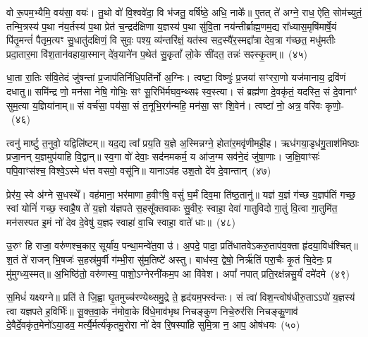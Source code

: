 वो रू॒पम॒भ्यैमि॒ वय॑सा॒ वयः॑। तु॒थो वो॑ वि॒श्ववे॑दा॒ वि भ॑जतु॒ वर्\mbox{}षि॑ष्ठे॒ अधि॒ नाके᳚॥ ए॒तत् ते॑ अग्ने॒ राध॒ ऐति॒ सोम॑च्युतं॒ तन्मि॒त्रस्य॑ प॒था न॑य॒र्तस्य॑ प॒था प्रेत॑ च॒न्द्रद॑क्षिणा य॒ज्ञस्य॑ प॒था सु॑वि॒ता नय॑न्तीर्ब्राह्म॒णम॒द्य रा᳚ध्यास॒मृषि॑मार्\mbox{}षे॒यं पि॑तृ॒मन्तं॑ पैतृम॒त्यꣳ सु॒धातु॑दक्षिणं॒ वि सुवः॒ पश्य॒ व्य॑न्तरि॑क्षं॒ यत॑स्व सद॒स्यै॑र॒स्मद्दा᳚त्रा देव॒त्रा ग॑च्छत॒ मधु॑मतीः प्रदा॒तार॒मा वि॑श॒तान॑वहाया॒स्मान् दे॑व॒याने॑न प॒थेत॑ सु॒कृतां᳚ लो॒के सी॑दत॒ तन्नः॑ सꣴस्कृ॒तम्॥~(४५)

{\anuvakamend[{रू॒पेण॑ सद॒स्यै॑र॒ष्टाद॑श च}]}%

धा॒ता रा॒तिः स॑वि॒तेदं जु॑षन्तां प्र॒जा\-प॑तिर्निधि॒पति॑र्नो अ॒ग्निः। त्वष्टा॒ विष्णुः॑ प्र॒जया॑ सꣳररा॒णो यज॑मानाय॒ द्रवि॑णं दधातु॥ समि॑न्द्र णो॒ मन॑सा नेषि॒ गोभिः॒ सꣳ सू॒रिभि॑र्मघव॒न्थ्सꣴ स्व॒स्त्या। सं ब्रह्म॑णा दे॒वकृ॑तं॒ यदस्ति॒ सं दे॒वानाꣳ॑ सुम॒त्या य॒ज्ञिया॑नाम्॥ सं वर्च॑सा॒ पय॑सा॒ सं त॒नूभि॒रग॑न्महि॒ मन॑सा॒ सꣳ शि॒वेन॑। त्वष्टा॑ नो॒ अत्र॒ वरि॑वः कृणो॒-~(४६)

त्वनु॑ मार्ष्टु त॒नुवो॒ यद्विलि॑ष्टम्॥ यद॒द्य त्वा᳚ प्रय॒ति य॒ज्ञे अ॒स्मिन्नग्ने॒ होता॑र॒मवृ॑णीमही॒ह। ऋध॑गया॒डृध॑गु॒ताश॑मिष्ठाः प्रजा॒नन् य॒ज्ञमुप॑याहि वि॒द्वान्॥ स्व॒गा वो॑ देवाः॒ सद॑नमकर्म॒ य आ॑ज॒ग्म सव॑ने॒दं जु॑षा॒णाः। ज॒क्षि॒वाꣳसः॑ पपि॒वाꣳस॑श्च॒ विश्वे॒\-ऽस्मे ध॑त्त वसवो॒ वसू॑नि॥ याना\-ऽव॑ह उश॒तो दे॑व दे॒वान्तान्~(४७)

प्रेर॑य॒ स्वे अ॑ग्ने स॒धस्थे᳚। वह॑माना॒ भर॑माणा ह॒वीꣳषि॒ वसुं॑ घ॒र्मं दिव॒मा ति॑ष्ठ॒तानु॑॥ यज्ञ॑ य॒ज्ञं ग॑च्छ य॒ज्ञप॑तिं गच्छ॒ स्वां योनिं॑ गच्छ॒ स्वाहै॒ष ते॑ य॒ज्ञो य॑ज्ञपते स॒हसू᳚क्तवाकः सु॒वीरः॒ स्वाहा॒ देवा॑ गातुविदो गा॒तुं वि॒त्वा गा॒तुमि॑त॒ मन॑सस्पत इ॒मं नो॑ देव दे॒वेषु॑ य॒ज्ञꣴ स्वाहा॑ वा॒चि स्वाहा॒ वाते॑ धाः॥~(४८)

{\anuvakamend[{कृ॒णो॒तु॒ तान॒ष्टाच॑त्वारिꣳशच्च}]}%

उ॒रुꣳ हि राजा॒ वरु॑णश्च॒कार॒ सूर्या॑य॒ पन्था॒मन्वे॑त॒वा उ॑। अ॒पदे॒ पादा॒ प्रति॑धातवे\-ऽकरु॒ताप॑व॒क्ता हृ॑दया॒विध॑श्चित्॥ श॒तं ते॑ राजन् भि॒षजः॑ स॒हस्र॑मु॒र्वी ग॑म्भी॒रा सु॑म॒तिष्टे॑ अस्तु। बाध॑स्व॒ द्वेषो॒ निर्\mbox{}ऋ॑तिं परा॒चैः कृ॒तं चि॒देनः॒ प्र मु॑मुग्ध्य॒स्मत्॥ अ॒भिष्ठि॑तो॒ वरु॑णस्य॒ पाशो॒\-ऽग्नेरनी॑कम॒प आ वि॑वेश। अपां᳚ नपात् प्रति॒रक्ष॑न्नसु॒र्यं॑ दमे॑दमे~(४९)

स॒मिधं॑ यक्ष्यग्ने॥ प्रति॑ ते जि॒ह्वा घृ॒तमुच्च॑रण्येथ्समु॒द्रे ते॒ हृद॑यम॒फ्स्व॑न्तः। सं त्वा॑ विश॒न्त्वोष॑धीरु॒ता\-ऽ\-ऽपो॑ य॒ज्ञस्य॑ त्वा यज्ञपते ह॒विर्भिः॑॥ सू॒क्त॒वा॒के न॑मोवा॒के वि॑धे॒माव॑भृथ निचङ्कुण निचे॒रुर॑सि निचङ्कु॒णाव॑ दे॒वैर्दे॒वकृ॑त॒मेनो॑\-ऽया॒डव॒ मर्त्यै॒र्मर्त्य॑कृतमु॒रोरा नो॑ देव रि॒षस्पा॑हि सुमि॒त्रा न॒ आप॒ ओष॑धयः~(५०)

